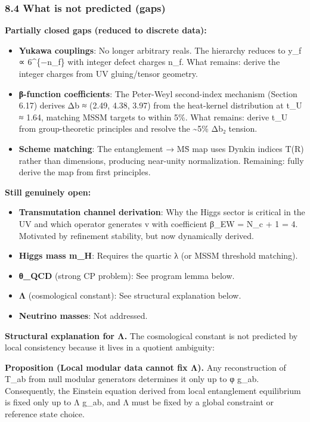\subsubsection{8.4 What is not predicted (gaps)}\label{84-what-is-not-predicted-gaps}

\textbf{Partially closed gaps (reduced to discrete data):}

\begin{itemize}
\tightlist
\item
  \textbf{Yukawa couplings}: No longer arbitrary reals. The hierarchy reduces to y\_f ∝ 6\^{}\{−n\_f\} with integer defect charges n\_f. What remains: derive the integer charges from UV gluing/tensor geometry.
\item
  \textbf{β-function coefficients}: The Peter-Weyl second-index mechanism (Section 6.17) derives Δb ≈ (2.49, 4.38, 3.97) from the heat-kernel distribution at t\_U ≈ 1.64, matching MSSM targets to within 5\%. What remains: derive t\_U from group-theoretic principles and resolve the \textasciitilde5\% Δb₂ tension.
\item
  \textbf{Scheme matching}: The entanglement → M\={S} map uses Dynkin indices T(R) rather than dimensions, producing near-unity normalization. Remaining: fully derive the map from first principles.
\end{itemize}

\textbf{Still genuinely open:}

\begin{itemize}
\tightlist
\item
  \textbf{Transmutation channel derivation}: Why the Higgs sector is critical in the UV and which operator generates v with coefficient β\_EW = N\_c + 1 = 4. Motivated by refinement stability, but now dynamically derived.
\item
  \textbf{Higgs mass m\_H}: Requires the quartic λ (or MSSM threshold matching).
\item
  \textbf{θ\_QCD} (strong CP problem): See program lemma below.
\item
  \textbf{Λ} (cosmological constant): See structural explanation below.
\item
  \textbf{Neutrino masses}: Not addressed.
\end{itemize}

\textbf{Structural explanation for Λ.} The cosmological constant is not predicted by local consistency because it lives in a quotient ambiguity:

\textbf{Proposition (Local modular data cannot fix Λ).} Any reconstruction of T\_ab from null modular generators determines it only up to φ g\_ab. Consequently, the Einstein equation derived from local entanglement equilibrium is fixed only up to Λ g\_ab, and Λ must be fixed by a global constraint or reference state choice.

